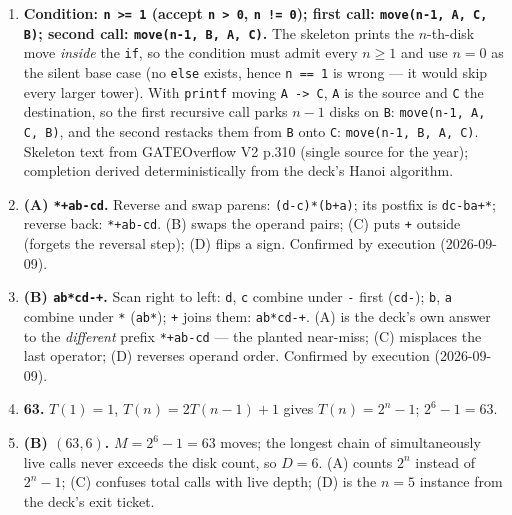 \documentclass[11pt]{article}
\begin{document}
\begin{enumerate}
\item[\textbf{Q4}] \textbf{Condition: \texttt{n >= 1} (accept \texttt{n > 0}, \texttt{n != 0}); first call: \texttt{move(n-1, A, C, B)}; second call: \texttt{move(n-1, B, A, C)}.} The skeleton prints the $n$-th-disk move \emph{inside} the \texttt{if}, so the condition must admit every $n \geq 1$ and use $n = 0$ as the silent base case (no \texttt{else} exists, hence \texttt{n == 1} is wrong --- it would skip every larger tower). With \texttt{printf} moving \texttt{A -> C}, \texttt{A} is the source and \texttt{C} the destination, so the first recursive call parks $n-1$ disks on \texttt{B}: \texttt{move(n-1, A, C, B)}, and the second restacks them from \texttt{B} onto \texttt{C}: \texttt{move(n-1, B, A, C)}. Skeleton text from GATEOverflow V2 p.310 (single source for the year); completion derived deterministically from the deck's Hanoi algorithm.

\item[\textbf{Q5}] \textbf{(A) \texttt{*+ab-cd}.} Reverse and swap parens: \texttt{(d-c)*(b+a)}; its postfix is \texttt{dc-ba+*}; reverse back: \texttt{*+ab-cd}. (B) swaps the operand pairs; (C) puts \texttt{+} outside (forgets the reversal step); (D) flips a sign. Confirmed by execution (2026-09-09).

\item[\textbf{Q6}] \textbf{(B) \texttt{ab*cd-+}.} Scan right to left: \texttt{d}, \texttt{c} combine under \texttt{-} first (\texttt{cd-}); \texttt{b}, \texttt{a} combine under \texttt{*} (\texttt{ab*}); \texttt{+} joins them: \texttt{ab*cd-+}. (A) is the deck's own answer to the \emph{different} prefix \texttt{*+ab-cd} --- the planted near-miss; (C) misplaces the last operator; (D) reverses operand order. Confirmed by execution (2026-09-09).

\item[\textbf{Q7}] \textbf{63.} $T(1) = 1$, $T(n) = 2T(n-1) + 1$ gives $T(n) = 2^{n} - 1$; $2^{6} - 1 = 63$.

\item[\textbf{Q8}] \textbf{(B) $(63, 6)$.} $M = 2^{6} - 1 = 63$ moves; the longest chain of simultaneously live calls never exceeds the disk count, so $D = 6$. (A) counts $2^{n}$ instead of $2^{n} - 1$; (C) confuses total calls with live depth; (D) is the $n = 5$ instance from the deck's exit ticket.
\end{enumerate}
\end{document}
